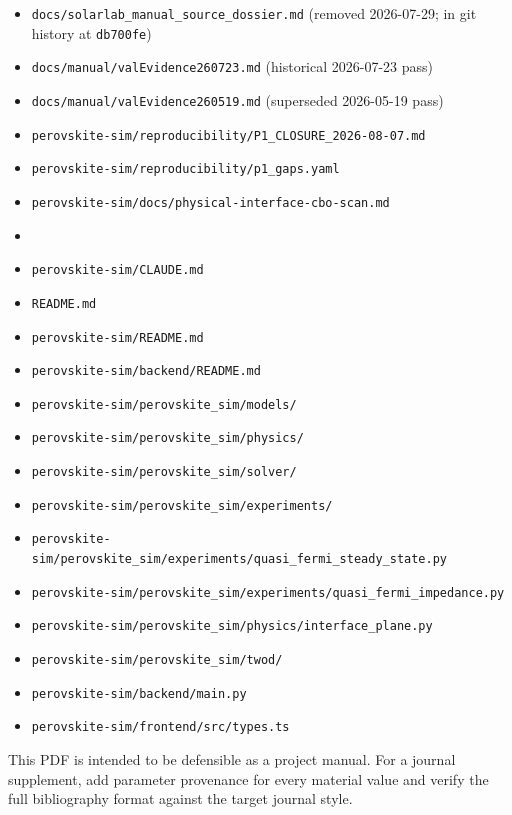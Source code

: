 \documentclass[
  11pt,
  american,
]{report}
\begin{document}
\begin{itemize}
\item
  \texttt{docs/solarlab\_manual\_source\_dossier.md} (removed
  2026-07-29; in git history at \texttt{db700fe})
\item
  \texttt{docs/manual/valEvidence260723.md} (historical 2026-07-23 pass)
\item
  \texttt{docs/manual/valEvidence260519.md} (superseded 2026-05-19 pass)
\item
  \texttt{perovskite-sim/reproducibility/P1\_CLOSURE\_2026-08-07.md}
\item
  \texttt{perovskite-sim/reproducibility/p1\_gaps.yaml}
\item
  \texttt{perovskite-sim/docs/physical-interface-cbo-scan.md}
\item
\item
  \texttt{perovskite-sim/CLAUDE.md}
\item
  \texttt{README.md}
\item
  \texttt{perovskite-sim/README.md}
\item
  \texttt{perovskite-sim/backend/README.md}
\item
  \texttt{perovskite-sim/perovskite\_sim/models/}
\item
  \texttt{perovskite-sim/perovskite\_sim/physics/}
\item
  \texttt{perovskite-sim/perovskite\_sim/solver/}
\item
  \texttt{perovskite-sim/perovskite\_sim/experiments/}
\item
  \texttt{perovskite-sim/perovskite\_sim/experiments/quasi\_fermi\_steady\_state.py}
\item
  \texttt{perovskite-sim/perovskite\_sim/experiments/quasi\_fermi\_impedance.py}
\item
  \texttt{perovskite-sim/perovskite\_sim/physics/interface\_plane.py}
\item
  \texttt{perovskite-sim/perovskite\_sim/twod/}
\item
  \texttt{perovskite-sim/backend/main.py}
\item
  \texttt{perovskite-sim/frontend/src/types.ts}
\end{itemize}

This PDF is intended to be defensible as a project manual. For a journal
supplement, add parameter provenance for every material value and verify
the full bibliography format against the target journal style.
\end{document}
